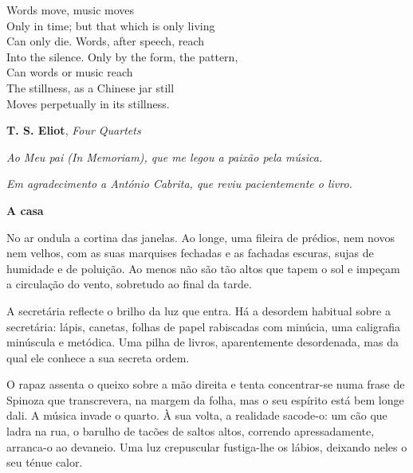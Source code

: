 \movetooddpage
\thispagestyle{empty}
\begin{vplace}[0.8]
\begin{flushright}
Words move, music moves\\
Only in time; but that which is only living\\
Can only die. Words, after speech, reach\\
Into the silence. Only by the form, the pattern,\\
Can words or music reach\\
The stillness, as a Chinese jar still\\
Moves perpetually in its stillness.

\medskip

\textbf{T. S. Eliot}, \emph{Four Quartets}
\end{flushright}
\end{vplace}
\pagebreak

\thispagestyle{empty}
\begin{flushright}
\begin{vplace}[0.8]
\emph{Ao Meu pai (\emph{In Memoriam}), que me legou a paixão pela música.}

\medskip

\emph{Em agradecimento a António Cabrita, que reviu pacientemente o livro.}
\end{vplace}
\end{flushright}

\vspace*{1.8cm}
\noindent{}\textbf{A casa}

\bigskip

No ar ondula a cortina das janelas. Ao longe, uma fileira de prédios,
nem novos nem velhos, com as suas marquises fechadas e as fachadas
escuras, sujas de humidade e de poluição. Ao menos não são tão altos que
tapem o sol e impeçam a circulação do vento, sobretudo ao final da
tarde.

A secretária reflecte o brilho da luz que entra. Há a desordem habitual
sobre a secretária: lápis, canetas, folhas de papel rabiscadas com
minúcia, uma caligrafia minúscula e metódica. Uma pilha de livros,
aparentemente desordenada, mas da qual ele conhece a sua secreta ordem.

O rapaz assenta o queixo sobre a mão direita e tenta concentrar-se numa
frase de Spinoza que transcrevera, na margem da folha, mas o seu
espírito está bem longe dali. A música invade o quarto. À sua volta, a
realidade sacode-o: um cão que ladra na rua, o barulho de tacões de
saltos altos, correndo apressadamente, arranca-o ao devaneio. Uma luz
crepuscular fustiga-lhe os lábios, deixando neles o seu ténue calor.

